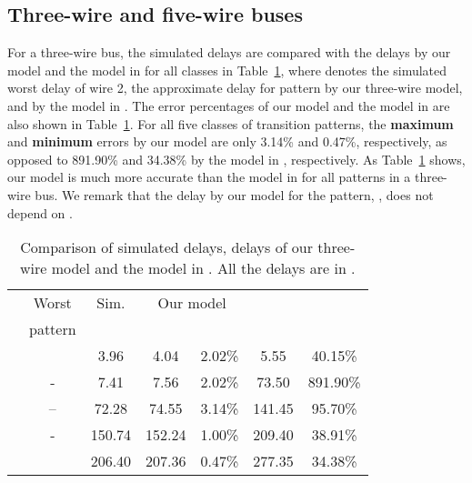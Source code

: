\documentclass[10pt,journal]{IEEEtran}
\begin{document}
\subsection{Three-wire and five-wire buses}
For a three-wire bus, the simulated delays are compared with the delays by our model and the model in \cite{Sot01} for all classes in Table~\ref{tab:1}, where  denotes the simulated worst delay of wire 2,  the approximate delay for  pattern by our three-wire model, and  by the model in \cite{Sot01}. The error percentages of our model and the model in \cite{Sot01} are also shown in Table~\ref{tab:1}. For all five classes of transition patterns, the \textbf{maximum} and \textbf{minimum} errors by our model are only 3.14\% and 0.47\%, respectively, as opposed to 891.90\% and 34.38\% by the model in \cite{Sot01}, respectively. As Table~\ref{tab:1} shows, our model is much more accurate than the model in \cite{Sot01} for all patterns in a three-wire bus. We remark that the delay by our model for the  pattern, , does not depend on .


\begin{table}
\caption{Comparison of simulated delays, delays of our three-wire model and the model in \cite{Sot01}. All the delays are in .}\label{tab:1}
\begin{center}
\begin{tabular}{|r|c|c|c|c|c|c|}
\hline
\multirow{2}{*}{}& Worst & Sim. & \multicolumn{2}{|c|}{Our model} & \multicolumn{2}{|c|}{\cite{Sot01}}\\
\cline{3-7} & pattern &  &  &  &  &  \\
\hline
 &  & 3.96 & 4.04 & 2.02\% & 5.55 & 40.15\%\\
\hline
 & - & 7.41 & 7.56 & 2.02\% & 73.50  & 891.90\%\\
\hline
 & -- & 72.28 & 74.55 &  3.14\% & 141.45 & 95.70\%\\
\hline
 & - & 150.74 & 152.24 &  1.00\% & 209.40 & 38.91\%\\
\hline
 &  & 206.40 & 207.36 & 0.47\% & 277.35  & 34.38\%\\
\hline
\end{tabular}
\end{center}
\end{table}
\end{document}
